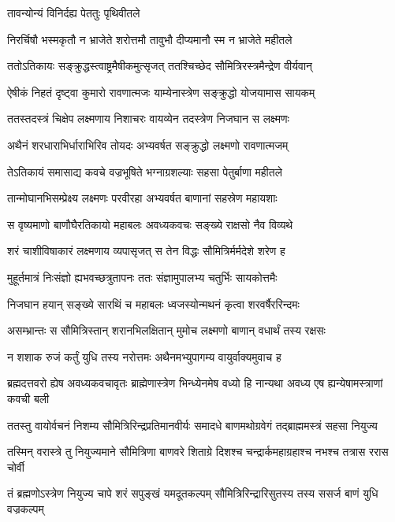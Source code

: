 \onelineshloka
{तावन्योन्यं विनिर्दह्य पेततुः पृथिवीतले} %

\twolineshloka
{निरर्चिषौ भस्मकृतौ न भ्राजेते शरोत्तमौ}
{तावुभौ दीप्यमानौ स्म न भ्राजेते महीतले} %

\twolineshloka
{ततोऽतिकायः सङ्क्रुद्धस्त्वाष्ट्रमैषीकमुत्सृजत्}
{ततश्चिच्छेद सौमित्रिरस्त्रमैन्द्रेण वीर्यवान्} %

\twolineshloka
{ऐषीकं निहतं दृष्ट्वा कुमारो रावणात्मजः}
{याम्येनास्त्रेण सङ्क्रुद्धो योजयामास सायकम्} %

\twolineshloka
{ततस्तदस्त्रं चिक्षेप लक्ष्मणाय निशाचरः}
{वायव्येन तदस्त्रेण निजघान स लक्ष्मणः} %

\twolineshloka
{अथैनं शरधाराभिर्धाराभिरिव तोयदः}
{अभ्यवर्षत सङ्क्रुद्धो लक्ष्मणो रावणात्मजम्} %

\twolineshloka
{तेऽतिकायं समासाद्य कवचे वज्रभूषिते}
{भग्नाग्रशल्याः सहसा पेतुर्बाणा महीतले} %

\twolineshloka
{तान्मोघानभिसम्प्रेक्ष्य लक्ष्मणः परवीरहा}
{अभ्यवर्षत बाणानां सहस्रेण महायशाः} %

\twolineshloka
{स वृष्यमाणो बाणौघैरतिकायो महाबलः}
{अवध्यकवचः सङ्ख्ये राक्षसो नैव विव्यथे} %

\twolineshloka
{शरं चाशीविषाकारं लक्ष्मणाय व्यपासृजत्}
{स तेन विद्धः सौमित्रिर्मर्मदेशे शरेण ह} %

\twolineshloka
{मुहूर्तमात्रं निःसंज्ञो ह्यभवच्छत्रुतापनः}
{ततः संज्ञामुपालभ्य चतुर्भिः सायकोत्तमैः} %

\twolineshloka
{निजघान हयान् सङ्ख्ये सारथिं च महाबलः}
{ध्वजस्योन्मथनं कृत्वा शरवर्षैररिन्दमः} %

\twolineshloka
{असम्भ्रान्तः स सौमित्रिस्तान् शरानभिलक्षितान्}
{मुमोच लक्ष्मणो बाणान् वधार्थं तस्य रक्षसः} %

\twolineshloka
{न शशाक रुजं कर्तुं युधि तस्य नरोत्तमः}
{अथैनमभ्युपागम्य वायुर्वाक्यमुवाच ह} %

\threelineshloka
{ब्रह्मदत्तवरो ह्येष अवध्यकवचावृतः}
{ब्राह्मेणास्त्रेण भिन्ध्येनमेष वध्यो हि नान्यथा}
{अवध्य एष ह्यन्येषामस्त्राणां कवची बली} %

\twolineshloka
{ततस्तु वायोर्वचनं निशम्य सौमित्रिरिन्द्रप्रतिमानवीर्यः}
{समादधे बाणमथोग्रवेगं तद्ब्राह्ममस्त्रं सहसा नियुज्य} %

\twolineshloka
{तस्मिन् वरास्त्रे तु नियुज्यमाने सौमित्रिणा बाणवरे शिताग्रे}
{दिशश्च चन्द्रार्कमहाग्रहाश्च नभश्च तत्रास ररास चोर्वी} %

\twolineshloka
{तं ब्रह्मणोऽस्त्रेण नियुज्य चापे शरं सपुङ्खं यमदूतकल्पम्}
{सौमित्रिरिन्द्रारिसुतस्य तस्य ससर्ज बाणं युधि वज्रकल्पम्} %

